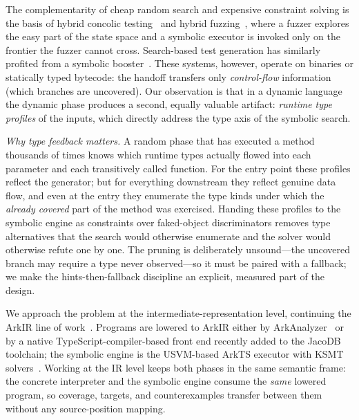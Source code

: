 \documentclass[sigconf,nonacm,screen]{acmart}
\begin{document}
The complementarity of cheap random search and expensive constraint solving
is the basis of hybrid concolic testing~\cite{majumdar2007} and hybrid
fuzzing~\cite{stephens2016,yun2018,godefroid2012}, where a fuzzer explores
the easy part of the state space and a symbolic executor is invoked only
on the frontier the fuzzer cannot cross. Search-based test generation has
similarly profited from a symbolic booster~\cite{galeotti2013}. These
systems, however, operate on binaries or statically typed bytecode: the
handoff transfers only \emph{control-flow} information (which branches are
uncovered). Our observation is that in a dynamic language the dynamic phase
produces a second, equally valuable artifact: \emph{runtime type profiles}
of the inputs, which directly address the type axis of the symbolic search.

\emph{Why type feedback matters.} A random phase that has executed a method
thousands of times knows which runtime types actually flowed into each
parameter and each transitively called function. For the entry point these
profiles reflect the generator; but for everything downstream they reflect
genuine data flow, and even at the entry they enumerate the type kinds under
which the \emph{already covered} part of the method was exercised. Handing
these profiles to the symbolic engine as constraints over faked-object
discriminators removes type alternatives that the search would otherwise
enumerate and the solver would otherwise refute one by one. The pruning is
deliberately unsound---the uncovered branch may require a type never
observed---so it must be paired with a fallback; we make the
hints-then-fallback discipline an explicit, measured part of the design.

We approach the problem at the intermediate-representation level, continuing
the ArkIR line of work~\cite{menshutin2025}. Programs are lowered to ArkIR
either by ArkAnalyzer~\cite{arkanalyzer} or by a native
TypeScript-compiler-based front end recently added to the JacoDB toolchain;
the symbolic engine is the USVM-based ArkTS executor with KSMT
solvers~\cite{usvm,ksmt}. Working at the IR level keeps both phases in the
same semantic frame: the concrete interpreter and the symbolic engine
consume the \emph{same} lowered program, so coverage, targets, and
counterexamples transfer between them without any source-position mapping.
\end{document}
